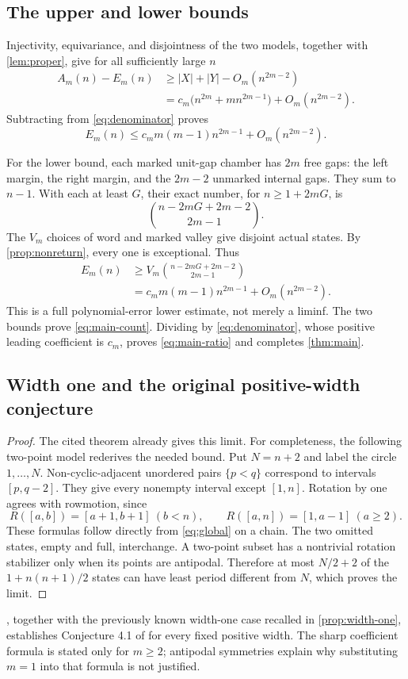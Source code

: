 \subsection{The upper and lower bounds}
Injectivity, equivariance, and disjointness of the two models, together with \cref{lem:proper}, give for all sufficiently large $n$
\begin{align*}
 A_m(n)-E_m(n)
 &\ge |X|+|Y|-O_m(n^{2m-2})\\
 &=c_m\bigl(n^{2m}+mn^{2m-1}\bigr)+O_m(n^{2m-2}).
\end{align*}
Subtracting from \eqref{eq:denominator} proves
\[
 E_m(n)\le c_m m(m-1)n^{2m-1}+O_m(n^{2m-2}).
\]

For the lower bound, each marked unit-gap chamber has $2m$ free gaps: the left margin, the right margin, and the $2m-2$ unmarked internal gaps. They sum to $n-1$. With each at least $G$, their exact number, for $n\ge1+2mG$, is
\[
 \binom{n-2mG+2m-2}{2m-1}.
\]
The $V_m$ choices of word and marked valley give disjoint actual states. By \cref{prop:nonreturn}, every one is exceptional. Thus
\begin{align*}
 E_m(n)&\ge V_m\binom{n-2mG+2m-2}{2m-1}\\
 &=c_m m(m-1)n^{2m-1}+O_m(n^{2m-2}).
\end{align*}
This is a full polynomial-error lower estimate, not merely a liminf. The two bounds prove \eqref{eq:main-count}. Dividing by \eqref{eq:denominator}, whose positive leading coefficient is $c_m$, proves \eqref{eq:main-ratio} and completes \cref{thm:main}.

\subsection{Width one and the original positive-width conjecture}
\begin{proof}
The cited theorem already gives this limit. For completeness, the following two-point model rederives the needed bound. Put $N=n+2$ and label the circle $1,\ldots,N$. Non-cyclic-adjacent unordered pairs $\{p<q\}$ correspond to intervals $[p,q-2]$. They give every nonempty interval except $[1,n]$. Rotation by one agrees with rowmotion, since
\[
 R([a,b])=[a+1,b+1]\ (b<n),\qquad
 R([a,n])=[1,a-1]\ (a\ge2).
\]
These formulas follow directly from \eqref{eq:global} on a chain. The two omitted states, empty and full, interchange. A two-point subset has a nontrivial rotation stabilizer only when its points are antipodal. Therefore at most $N/2+2$ of the $1+n(n+1)/2$ states can have least period different from $N$, which proves the limit.
\end{proof}
, together with the previously known width-one case recalled in \cref{prop:width-one}, establishes Conjecture 4.1 of \cite{LLMSW} for every fixed positive width. The sharp coefficient formula is stated only for $m\ge2$; antipodal symmetries explain why substituting $m=1$ into that formula is not justified.

